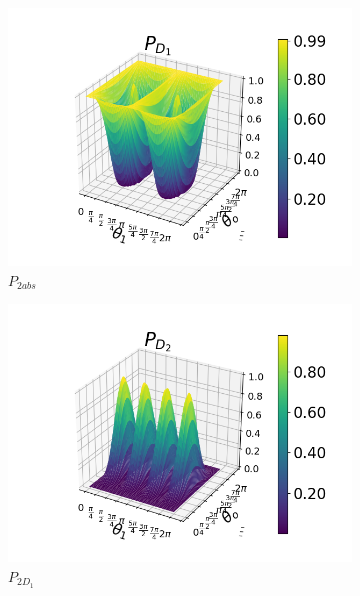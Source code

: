 \documentclass[12pt]{book}
\begin{document}
\begin{figure}[t!]
\centering
\begin{subfigure}[b]{0.4\linewidth}
\includegraphics[width=\linewidth]{images/PD1_BS_v.png}
\caption{$P_{2abs}$}
\label{fig:BS2}
\end{subfigure}
\begin{subfigure}[b]{0.4\linewidth}
\includegraphics[width=\linewidth]{images/PD2_BS_v.png}
\caption{$P_{2D_{1}}$}
\label{fig:westminster_aerea}
\end{subfigure}
\begin{subfigure}[b]{0.4\linewidth}

\end{subfigure}
\end{figure}
\end{document}
